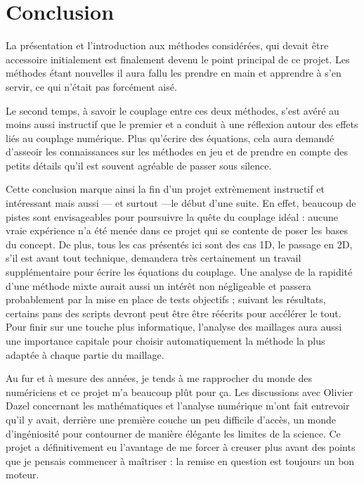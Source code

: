 \section*{Conclusion}

La présentation et l'introduction aux méthodes considérées, qui devait être accessoire initialement est finalement
devenu le point principal de ce projet. Les méthodes étant nouvelles il aura fallu les prendre en main et apprendre
à s'en servir, ce qui n'était pas forcément aisé.

Le second temps, à savoir le couplage entre ces deux méthodes, s'est avéré au moins aussi instructif que le premier et a
conduit à une réflexion autour des effets liés au couplage numérique. Plus qu'écrire des équations, cela aura demandé
d'asseoir les connaissances sur les méthodes en jeu et de prendre en compte des petits détails qu'il est souvent
agréable de passer sous silence.

Cette conclusion marque ainsi la fin d'un projet extrèmement instructif et intéressant mais aussi --- et surtout ---le début d'une
suite. En effet, beaucoup de pistes sont envisageables pour poursuivre la quête du couplage idéal  : aucune vraie
expérience n'a été menée dans ce projet qui se contente de poser les bases du concept. De plus, tous les cas
présentés ici sont des cas 1D, le passage en 2D, s'il est avant tout technique, demandera très certainement un travail
supplémentaire pour écrire les équations du couplage. Une analyse de la rapidité d'une méthode mixte aurait aussi un
intérêt non négligeable et passera probablement par la mise en place de tests objectifs ; suivant les résultats,
certains pans des scripts devront peut être être réécrits pour accélérer le tout. Pour finir sur une touche plus
informatique, l'analyse des maillages aura aussi une importance capitale pour choisir automatiquement la méthode la
plus adaptée à chaque partie du maillage.

Au fur et à mesure des années, je tends à me rapprocher du monde des numériciens et ce projet m'a beaucoup plût pour ça.
Les discussions avec Olivier Dazel concernant les mathématiques et l'analyse numérique m'ont fait entrevoir qu'il y
avait, derrière une première couche un peu difficile d'accès, un monde d'ingéniosité pour contourner de manière élégante
les limites de la science. Ce projet a définitivement eu l'avantage de me forcer à creuser plus avant des points que je
pensais commencer à maîtriser : la remise en question est toujours un bon moteur.
